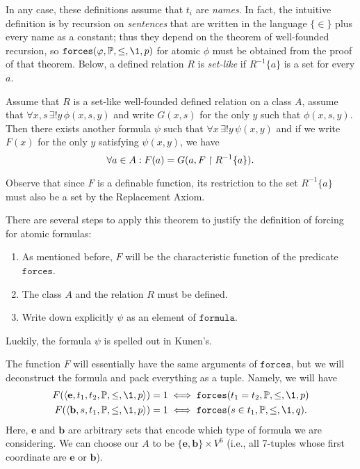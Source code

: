 \documentclass[11pt,english]{article}
\renewcommand{\PP}{\mathbb{P}}
\newcommand{\formula}{\ensuremath{\mathtt{formula}}}
\newcommand{\forceisa}{\mathtt{forces}}
\newcommand{\equ}{\mathbf{e}}
\newcommand{\bel}{\mathbf{b}}
\begin{document}
In any case, these definitions assume that $t_i$ are \emph{names}.
In fact, the intuitive definition is by recursion on \emph{sentences}
that are written in the language $\{\in\}$ plus every name as a
constant; thus they
depend on the theorem of well-founded recursion,
so $\forceisa(\phi,\PP,\leq,\1,p)$ for atomic $\phi$
must be obtained from the proof of that theorem. Below, a defined
relation $R$ is \emph{set-like} if $R^{-1}\{a\}$ is a set for every $a$.
%
\begin{theorem}
  Assume that $R$ is a
  set-like well-founded defined relation on a class $A$, assume that 
  $\forall  x,s\,\exists!y\,\phi(x,s,y)$ and write $G(x,s)$ for the
  only $y$ such that $\phi(x,s,y)$. Then there exists another formula 
   $\psi$ such that $\forall x\,\exists!y\,\psi(x,y)$ and if we write
  $F(x)$ for the only $y$ satisfying $\psi(x,y)$, we have
  \[
  \forall a\in A: F(a) = G(a,F\upharpoonright R^{-1}\{a\}).
  \]
\end{theorem}
%
Observe that since $F$ is a definable function, its restriction to the
set $R^{-1}\{a\}$ must also be a set by the Replacement Axiom.

There are several steps to apply this theorem to justify the
definition of forcing for atomic formulas:
\begin{enumerate}
\item As mentioned before, $F$ will be the characteristic function of
  the predicate $\forceisa$.
\item The class $A$ and the relation $R$ must be
  defined.
\item Write down explicitly $\psi$ as an element of
  $\formula$. 
\end{enumerate}
%
Luckily, the formula $\psi$ is spelled out in Kunen's.

The  function $F$ will essentially have 
the same  arguments  of $\forceisa$, but we will deconstruct the
formula and pack everything as a tuple. Namely, we will have
\begin{align}
  F(\lb\equ,t_1,t_2,\PP,\leq,\1,p\rb) =1 &\iff  
  \forceisa(t_1=t_2,\PP,\leq,\1,p) \label{eq:forcing-F-equ}\\
  F(\lb\bel,s,t_1,\PP,\leq,\1,p\rb) =1 &\iff  
  \forceisa(s\in t_1,\PP,\leq,\1,q). \label{eq:forcing-F-bel}
\end{align}
Here, $\equ$ and $\bel$ are arbitrary sets that encode which type of
formula we are considering. We can choose our $A$ to be
$\{\equ,\bel\}\times V^6$ (i.e., all 7-tuples whose first coordinate
are  $\equ$ or $\bel$).
\end{document}
